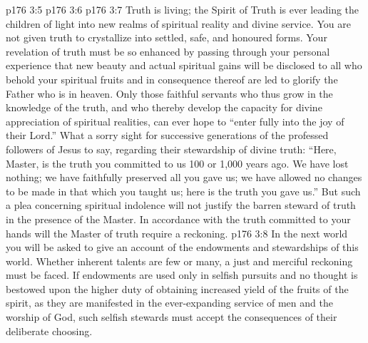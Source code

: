\vs p176 3:5 
\vs p176 3:6 
\vs p176 3:7 \pc Truth is living; the Spirit of Truth is ever leading the children of light into new realms of spiritual reality and divine service. You are not given truth to crystallize into settled, safe, and honoured forms. Your revelation of truth must be so enhanced by passing through your personal experience that new beauty and actual spiritual gains will be disclosed to all who behold your spiritual fruits and in consequence thereof are led to glorify the Father who is in heaven. Only those faithful servants who thus grow in the knowledge of the truth, and who thereby develop the capacity for divine appreciation of spiritual realities, can ever hope to “enter fully into the joy of their Lord.” What a sorry sight for successive generations of the professed followers of Jesus to say, regarding their stewardship of divine truth: “Here, Master, is the truth you committed to us 100 or 1,000 years ago. We have lost nothing; we have faithfully preserved all you gave us; we have allowed no changes to be made in that which you taught us; here is the truth you gave us.” But such a plea concerning spiritual indolence will not justify the barren steward of truth in the presence of the Master. In accordance with the truth committed to your hands will the Master of truth require a reckoning.
\vs p176 3:8 In the next world you will be asked to give an account of the endowments and stewardships of this world. Whether inherent talents are few or many, a just and merciful reckoning must be faced. If endowments are used only in selfish pursuits and no thought is bestowed upon the higher duty of obtaining increased yield of the fruits of the spirit, as they are manifested in the ever\hyp{}expanding service of men and the worship of God, such selfish stewards must accept the consequences of their deliberate choosing.
